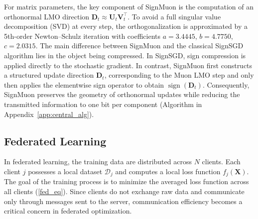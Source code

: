 \documentclass{article}
\begin{document}
For matrix parameters, the key component of SignMuon is the computation of an orthonormal LMO direction $\mathbf{D}_t \approx \mathbf{U}_t \mathbf{V}_t^\top$. To avoid a full singular value decomposition (SVD) at every step, the orthogonalization is approximated by a 5th-order Newton--Schulz iteration with coefficients $a=3.4445$, $b=4.7750$, $c=2.0315$. The main difference between SignMuon and the classical SignSGD algorithm lies in the object being compressed. In SignSGD, sign compression is applied directly to the stochastic gradient. In contrast, SignMuon first constructs a structured update direction $\mathbf{D}_t$, corresponding to the Muon LMO step and only then applies the elementwise sign operator to obtain $\operatorname{sign}(\mathbf{D}_t)$. Consequently, SignMuon preserves the geometry of orthonormal updates while reducing the transmitted information to one bit per component (Algorithm in Appendix~\ref{app:central_alg}).

\subsection{Federated Learning}
In federated learning, the training data are distributed across $N$ clients. Each client $j$ possesses a local dataset $\mathcal{D}_j$ and computes a local loss function $f_j(\mathbf{X})$. The goal of the training process is to minimize the averaged loss function across all clients  (\ref{fed_eq}). Since clients do not exchange raw data and communicate only through messages sent to the server, communication efficiency becomes a critical concern in federated optimization.
\end{document}
